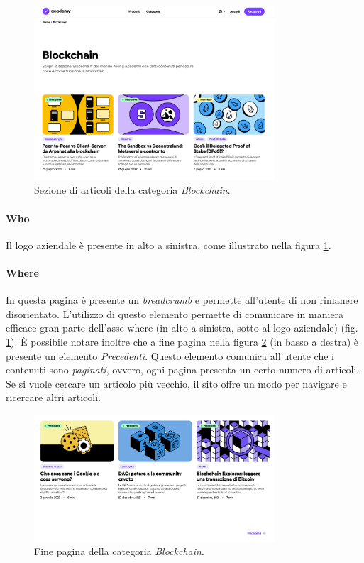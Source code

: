 \begin{figure}[H]
  \centering
  \includegraphics[width=0.80\textwidth]{res/images/internal-pages/academy/academy-3.png}
  \caption{Sezione di articoli della categoria \textit{Blockchain}.}
  \label{fig:academy-3}
\end{figure}

\paragraph{Who}

Il logo aziendale è presente in alto a sinistra, come illustrato 
nella figura \ref{fig:academy-3}.

\paragraph{Where}

In questa pagina è presente un \textit{breadcrumb} e permette all'utente 
di non rimanere disorientato. L'utilizzo di questo elemento permette di 
comunicare in maniera efficace gran parte dell'asse where (in alto a 
sinistra, sotto al logo aziendale) (fig. \ref{fig:academy-3}). È possibile 
notare inoltre che a fine pagina nella figura \ref{fig:academy-4} 
(in basso a destra) è presente un elemento \textit{Precedenti}. Questo 
elemento comunica all'utente che i contenuti sono \textit{paginati}, 
ovvero, ogni pagina presenta un certo numero di articoli. Se si vuole 
cercare un articolo più vecchio, il sito offre un modo per navigare e 
ricercare altri articoli.

\begin{figure}[H]
  \centering
  \includegraphics[width=0.80\textwidth]{res/images/internal-pages/academy/academy-4.png}
  \caption{Fine pagina della categoria \textit{Blockchain}.}
  \label{fig:academy-4}
\end{figure}

